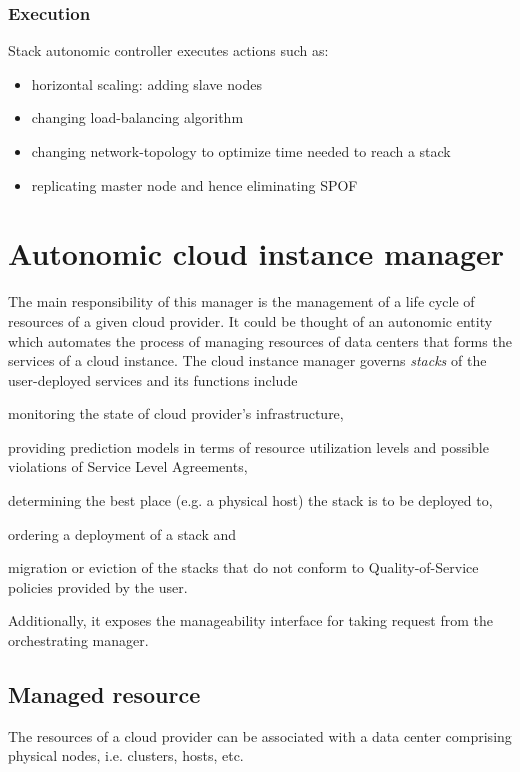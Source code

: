 \subsubsection{Execution}
Stack autonomic controller executes actions such as:
\begin{itemize}
 \item horizontal scaling: adding slave nodes
 \item changing load-balancing algorithm
 \item changing network-topology to optimize time needed to reach a stack
 \item replicating master node and hence eliminating SPOF
\end{itemize}



\section{Autonomic cloud instance manager}
The main responsibility of this manager is the management of a life cycle of resources of a given cloud provider. It could be thought of an autonomic entity which automates the process of managing resources of data centers that forms the services of a cloud instance. The cloud instance manager governs \emph{stacks} of the user-deployed services and its functions include
\begin{inparaenum}[a)]
\item monitoring the state of cloud provider's infrastructure,
\item providing prediction models in terms of resource utilization levels and possible violations of Service Level Agreements,
\item determining the best place (e.g. a physical host) the stack is to be deployed to,
\item ordering a deployment of a stack and
\item migration or eviction of the stacks that do not conform to Quality-of-Service policies provided by the user.
\end{inparaenum}
Additionally, it exposes the manageability interface for taking request from the orchestrating manager.

\subsection{Managed resource}
The resources of a cloud provider can be associated with a data center comprising physical nodes, i.e. clusters, hosts, etc.

